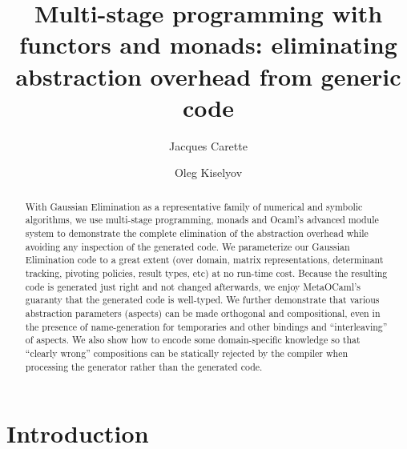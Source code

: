 \documentclass{llncs}
\begin{document}
\title{Multi-stage programming with functors and monads:
eliminating abstraction overhead from generic code}
\author{Jacques Carette
 \and
Oleg Kiselyov
}

\maketitle

\begin{abstract}
With Gaussian Elimination as a representative family of numerical
and symbolic
algorithms, we use multi-stage programming, monads and Ocaml's
advanced module system to demonstrate the complete elimination of the
abstraction overhead while avoiding any inspection of the generated
code.  We parameterize our Gaussian Elimination code to a great extent
(over domain, matrix representations, determinant tracking, 
pivoting policies, result types, etc) at no run-time cost.  Because
the resulting code is generated just right and not changed afterwards,
we enjoy MetaOCaml's guaranty that the generated code is well-typed.
We further demonstrate that various abstraction parameters (aspects)
can be made orthogonal and compositional, even in the presence of
name-generation for temporaries and other bindings and
``interleaving'' of aspects.  We also show how to encode some
domain-specific knowledge so that ``clearly wrong'' compositions can
be statically rejected by the compiler when processing the generator
rather than the generated code.
\end{abstract}

\section{Introduction}
\end{document}
